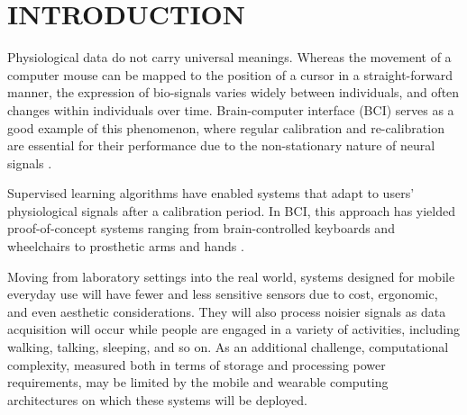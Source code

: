\section{\uppercase{Introduction}}
\label{sec:introduction}

\noindent Physiological data do not carry universal meanings. Whereas the movement of a computer mouse can be mapped to the position of a cursor in a straight-forward manner, the expression of bio-signals varies widely between individuals, and often changes within individuals over time. Brain-computer interface (BCI) serves as a good example of this phenomenon, where regular calibration and re-calibration are essential for their performance due to the non-stationary nature of neural signals \cite{dornhege_toward_2007,mcfarland_brain-computer_2011}.

Supervised learning algorithms have enabled systems that adapt to users' physiological signals after a calibration period. In BCI, this approach has yielded proof-of-concept systems ranging from brain-controlled keyboards and wheelchairs to prosthetic arms and hands \cite{blankertz_note_2007,millan_combining_2010,d._mattia_brain_2011,hill_practical_2014,campbell_neurophone:_2010}. 



Moving from laboratory settings into the real world, systems designed for mobile everyday use will have fewer and less sensitive sensors due to cost, ergonomic, and even aesthetic considerations. They will also process noisier signals as data acquisition will occur while people are engaged in a variety of activities, including walking, talking, sleeping, and so on. As an additional challenge, computational complexity, measured both in terms of storage and processing power requirements, may be limited by the mobile and wearable computing architectures on which these systems will be deployed. 

